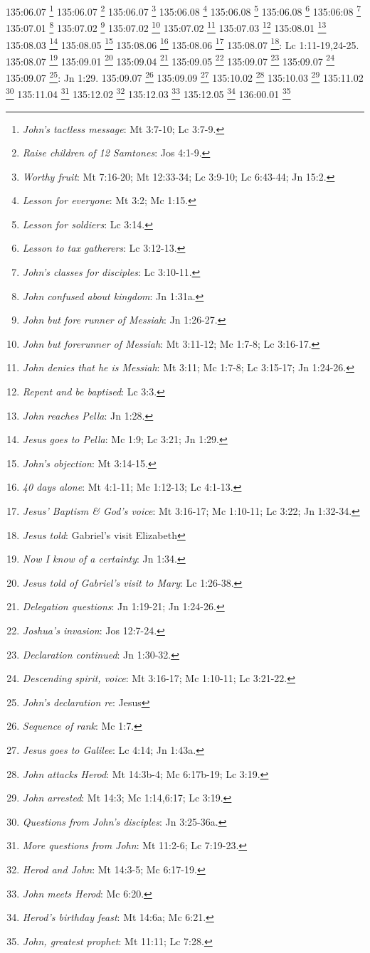 {{{{{{{{{{{135:06.07 \footnote{\textit{John's tactless message}: Mt 3:7-10; Lc 3:7-9.}
135:06.07 \footnote{\textit{Raise children of 12 Samtones}: Jos 4:1-9.}
135:06.07 \footnote{\textit{Worthy fruit}: Mt 7:16-20; Mt 12:33-34; Lc 3:9-10; Lc 6:43-44; Jn 15:2.}
135:06.08 \footnote{\textit{Lesson for everyone}: Mt 3:2; Mc 1:15.}
135:06.08 \footnote{\textit{Lesson for soldiers}: Lc 3:14.}
135:06.08 \footnote{\textit{Lesson to tax gatherers}: Lc 3:12-13.}
135:06:08 \footnote{\textit{John's classes for disciples}: Lc 3:10-11.}
135:07.01 \footnote{\textit{John confused about kingdom}: Jn 1:31a.}
135:07.02 \footnote{\textit{John but fore runner of Messiah}: Jn 1:26-27.}
135:07.02 \footnote{\textit{John but forerunner of Messiah}: Mt 3:11-12; Mc 1:7-8; Lc 3:16-17.}
135:07.02 \footnote{\textit{John denies that he is Messiah}: Mt 3:11; Mc 1:7-8; Lc 3:15-17; Jn 1:24-26.}
135:07.03 \footnote{\textit{Repent and be baptised}: Lc 3:3.}
135:08.01 \footnote{\textit{John reaches Pella}: Jn 1:28.}
135:08.03 \footnote{\textit{Jesus goes to Pella}: Mc 1:9; Lc 3:21; Jn 1:29.}
135:08.05 \footnote{\textit{John's objection}: Mt 3:14-15.}
135:08.06 \footnote{\textit{40 days alone}: Mt 4:1-11; Mc 1:12-13; Lc 4:1-13.}
135:08.06 \footnote{\textit{Jesus' Baptism & God's voice}: Mt 3:16-17; Mc 1:10-11; Lc 3:22; Jn 1:32-34.}
135:08.07 \footnote{\textit{Jesus told}: Gabriel's visit Elizabeth}: Lc 1:11-19,24-25.}
135:08.07 \footnote{\textit{Now I know of a certainty}: Jn 1:34.}
135:09.01 \footnote{\textit{Jesus told of Gabriel's visit to Mary}: Lc 1:26-38.}
135:09.04 \footnote{\textit{Delegation questions}: Jn 1:19-21; Jn 1:24-26.}
135:09.05 \footnote{\textit{Joshua's invasion}: Jos 12:7-24.}
135:09.07 \footnote{\textit{Declaration continued}: Jn 1:30-32.}
135:09.07 \footnote{\textit{Descending spirit, voice}: Mt 3:16-17; Mc 1:10-11; Lc 3:21-22.}
135:09.07 \footnote{\textit{John's declaration re}: Jesus}: Jn 1:29.}
135:09.07 \footnote{\textit{Sequence of rank}: Mc 1:7.}
135:09.09 \footnote{\textit{Jesus goes to Galilee}: Lc 4:14; Jn 1:43a.}
135:10.02 \footnote{\textit{John attacks Herod}: Mt 14:3b-4; Mc 6:17b-19; Lc 3:19.}
135:10.03 \footnote{\textit{John arrested}: Mt 14:3; Mc 1:14,6:17; Lc 3:19.}
135:11.02 \footnote{\textit{Questions from John's disciples}: Jn 3:25-36a.}
135:11.04 \footnote{\textit{More questions from John}: Mt 11:2-6; Lc 7:19-23.}
135:12.02 \footnote{\textit{Herod and John}: Mt 14:3-5; Mc 6:17-19.}
135:12.03 \footnote{\textit{John meets Herod}: Mc 6:20.}
135:12.05 \footnote{\textit{Herod's birthday feast}: Mt 14:6a; Mc 6:21.}
136:00.01 \footnote{\textit{John, greatest prophet}: Mt 11:11; Lc 7:28.}
}}}}}}}}}
